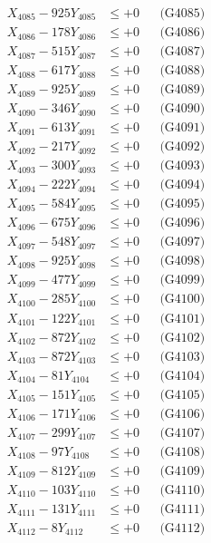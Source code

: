 \documentclass[a4paper,10pt]{article}
\begin{document}
{\begin{align}
X_{4085} - 925Y_{4085} &\leq +0 && \text{(G4085)} \\
X_{4086} - 178Y_{4086} &\leq +0 && \text{(G4086)} \\
X_{4087} - 515Y_{4087} &\leq +0 && \text{(G4087)} \\
X_{4088} - 617Y_{4088} &\leq +0 && \text{(G4088)} \\
X_{4089} - 925Y_{4089} &\leq +0 && \text{(G4089)} \\
X_{4090} - 346Y_{4090} &\leq +0 && \text{(G4090)} \\
\allowbreak
X_{4091} - 613Y_{4091} &\leq +0 && \text{(G4091)} \\
X_{4092} - 217Y_{4092} &\leq +0 && \text{(G4092)} \\
X_{4093} - 300Y_{4093} &\leq +0 && \text{(G4093)} \\
X_{4094} - 222Y_{4094} &\leq +0 && \text{(G4094)} \\
X_{4095} - 584Y_{4095} &\leq +0 && \text{(G4095)} \\
X_{4096} - 675Y_{4096} &\leq +0 && \text{(G4096)} \\
X_{4097} - 548Y_{4097} &\leq +0 && \text{(G4097)} \\
X_{4098} - 925Y_{4098} &\leq +0 && \text{(G4098)} \\
X_{4099} - 477Y_{4099} &\leq +0 && \text{(G4099)} \\
X_{4100} - 285Y_{4100} &\leq +0 && \text{(G4100)} \\
\allowbreak
X_{4101} - 122Y_{4101} &\leq +0 && \text{(G4101)} \\
X_{4102} - 872Y_{4102} &\leq +0 && \text{(G4102)} \\
X_{4103} - 872Y_{4103} &\leq +0 && \text{(G4103)} \\
X_{4104} - 81Y_{4104} &\leq +0 && \text{(G4104)} \\
X_{4105} - 151Y_{4105} &\leq +0 && \text{(G4105)} \\
X_{4106} - 171Y_{4106} &\leq +0 && \text{(G4106)} \\
X_{4107} - 299Y_{4107} &\leq +0 && \text{(G4107)} \\
X_{4108} - 97Y_{4108} &\leq +0 && \text{(G4108)} \\
X_{4109} - 812Y_{4109} &\leq +0 && \text{(G4109)} \\
X_{4110} - 103Y_{4110} &\leq +0 && \text{(G4110)} \\
\allowbreak
X_{4111} - 131Y_{4111} &\leq +0 && \text{(G4111)} \\
X_{4112} - 8Y_{4112} &\leq +0 && \text{(G4112)} \\

\end{align}}
\end{document}
